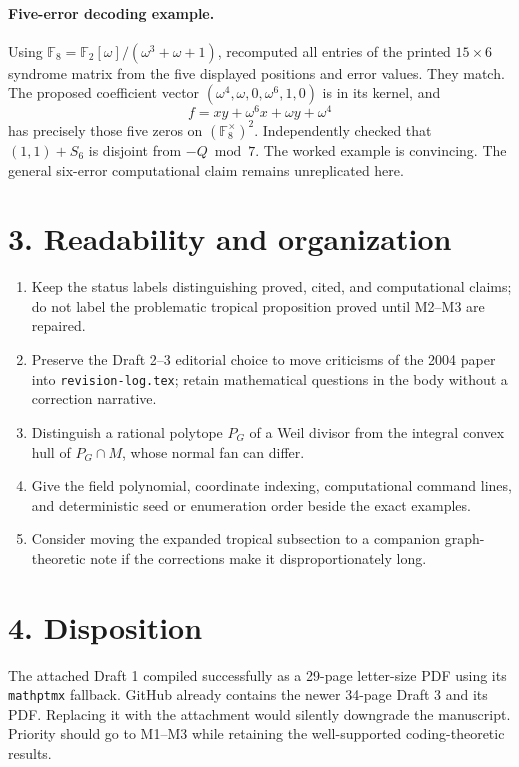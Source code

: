 \documentclass[12pt,letterpaper]{article}
\newcommand{\F}{\mathbb F}
\begin{document}
\paragraph{Five-error decoding example.}
Using \(\F_8=\F_2[\omega]/(\omega^3+\omega+1)\), recomputed all entries of the printed \(15\times6\) syndrome matrix from the five displayed positions and error values. They match. The proposed coefficient vector
\((\omega^4,\omega,0,\omega^6,1,0)\) is in its kernel, and
\[
 f=xy+\omega^6x+\omega y+\omega^4
\]
has precisely those five zeros on \((\F_8^\times)^2\). Independently checked that \((1,1)+S_6\) is disjoint from \(-Q\bmod7\). The worked example is convincing. The general six-error computational claim remains unreplicated here.

\section*{3. Readability and organization}
\begin{enumerate}[leftmargin=*,itemsep=4pt]
\item Keep the status labels distinguishing proved, cited, and computational claims; do not label the problematic tropical proposition proved until M2--M3 are repaired.
\item Preserve the Draft 2--3 editorial choice to move criticisms of the 2004 paper into \texttt{revision-log.tex}; retain mathematical questions in the body without a correction narrative.
\item Distinguish a rational polytope \(P_G\) of a Weil divisor from the integral convex hull of \(P_G\cap M\), whose normal fan can differ.
\item Give the field polynomial, coordinate indexing, computational command lines, and deterministic seed or enumeration order beside the exact examples.
\item Consider moving the expanded tropical subsection to a companion graph-theoretic note if the corrections make it disproportionately long.
\end{enumerate}

\section*{4. Disposition}
The attached Draft 1 compiled successfully as a 29-page letter-size PDF using its \texttt{mathptmx} fallback. GitHub already contains the newer 34-page Draft 3 and its PDF. Replacing it with the attachment would silently downgrade the manuscript. Priority should go to M1--M3 while retaining the well-supported coding-theoretic results.
\end{document}
